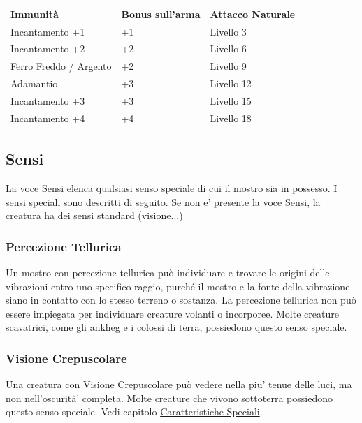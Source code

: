 \begin{multicols}{2}
\begin{tabularx}{0.45\textwidth}{lXX}
	\toprule
	\textbf{Immunità} & \textbf{Bonus sull'arma} & \textbf{Attacco Naturale}\\
	Incantamento +1         & +1              & Livello 3\\
	Incantamento +2         & +2              & Livello 6\\
	Ferro Freddo / Argento  & +2              & Livello 9\\
	Adamantio               & +3              & Livello 12\\
	Incantamento +3         & +3              & Livello 15\\
	Incantamento +4         & +4              & Livello 18\\
\end{tabularx}


\subsection{Sensi}

La voce Sensi elenca qualsiasi senso speciale di cui il mostro sia in possesso. I sensi speciali sono descritti di seguito. Se non e' presente la voce Sensi, la creatura ha dei sensi standard (visione...)

\subsubsection{Percezione Tellurica}

Un mostro con percezione tellurica può individuare e trovare le origini delle vibrazioni entro uno specifico raggio, purché il mostro e la fonte della vibrazione siano in contatto con lo stesso terreno o sostanza. La percezione tellurica non può essere impiegata per individuare creature volanti o incorporee. Molte creature scavatrici, come gli ankheg e i colossi di terra, possiedono questo senso speciale.

\subsubsection{Visione Crepuscolare}

Una creatura con Visione Crepuscolare può vedere nella piu' tenue delle luci, ma non nell'oscurità' completa. Molte creature che vivono sottoterra possiedono questo senso
speciale.  Vedi capitolo \hyperlink{visioneeluce}{Caratteristiche Speciali}.

\medskip
\begin{center}
	

\end{center}
\end{multicols}
